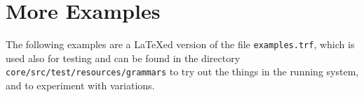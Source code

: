 \documentclass[11pt,a4paper]{report}
\begin{document}
\newpage
\appendix
\chapter{More Examples}

The following examples are a \LaTeX{}ed version of the file
\texttt{examples.trf}, which is used also for testing and can be found in the
directory \texttt{core/src/test/resources/grammars} to try out the things
in the running system, and to experiment with variations.\\


\end{document}
